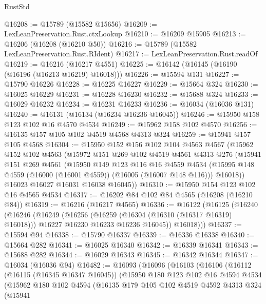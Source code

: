 \begin{lexlean}{RustStd}
\begin{coremodule}
@16208 := @15789 (@15582 @15656)
@16209 := LexLeanPreservation.Rust.ctxLookup
@16210 := @16209 @15905
@16213 := @16206 (@16208 (@16210 @50))
@16216 := @15789 (@15582 LexLeanPreservation.Rust.RIdent)
@16217 := LexLeanPreservation.Rust.readOf
@16219 := @16216 (@16217 @4551)
@16225 := @16142 (@16145 (@16190 (@16196 (@16213 @16219) @16018)))
@16226 := @15594 @131
@16227 := @15790 @16226
@16228 := @16225 @16227
@16229 := @15664 @324
@16230 := @16025 @16229
@16231 := @16228 @16230
@16232 := @15688 @324
@16233 := @16029 @16232
@16234 := @16231 @16233
@16236 := @16034 (@16036 @131)
@16240 := @16131 (@16134 (@16234 @16236 @16045))
@16246 := @15950 @158 @123 @102 @16 @4570 @4534
@16249 := @15962 @158 @102 @4570
@16256 := @16135 @157 @105 @102 @4519 @4568 @4313 @324
@16259 := @15941 @157 @105 @4568
@16304 := @15950
    @152
    @156
    @102
    @104
    @4563
    @4567
    (@15962
      @152
      @102
      @4563
      (@15972
        @151
        @269
        @102
        @4519
        @4561
        @4313
        @276
        (@15941
          @151
          @269
          @4561
          (@15950
            @149
            @123
            @116
            @16
            @4559
            @4534
            (@15995 @148 @4559 (@16000 (@16001 @4559)) (@16005 (@16007 @148 @116)))
            @16018))
        @16023
        @16027
        @16031
        @16038
        @16045))
@16310 := @15950 @154 @123 @102 @16 @4565 @4534
@16317 := @16202 @84 @102 @84 @4565 (@16208 (@16210 @84))
@16319 := @16216 (@16217 @4565)
@16336 := @16122
    (@16125
      (@16240
        (@16246
          (@16249
            (@16256
              (@16259 (@16304 (@16310 (@16317 @16319) @16018)))
              @16227
              @16230
              @16233
              @16236
              @16045))
          @16018)))
@16337 := @15594 @94
@16338 := @15790 @16337
@16339 := @16336 @16338
@16340 := @15664 @282
@16341 := @16025 @16340
@16342 := @16339 @16341
@16343 := @15688 @282
@16344 := @16029 @16343
@16345 := @16342 @16344
@16347 := @16034 (@16036 @94)
@16482 := @16093
    (@16096
      (@16103
        (@16106
          (@16112
            (@16115 (@16345 @16347 @16045))
            (@15950
              @180
              @123
              @102
              @16
              @4594
              @4534
              (@15962
                @180
                @102
                @4594
                (@16135
                  @179
                  @105
                  @102
                  @4519
                  @4592
                  @4313
                  @324
                  (@15941

\end{coremodule}
\end{lexlean}
